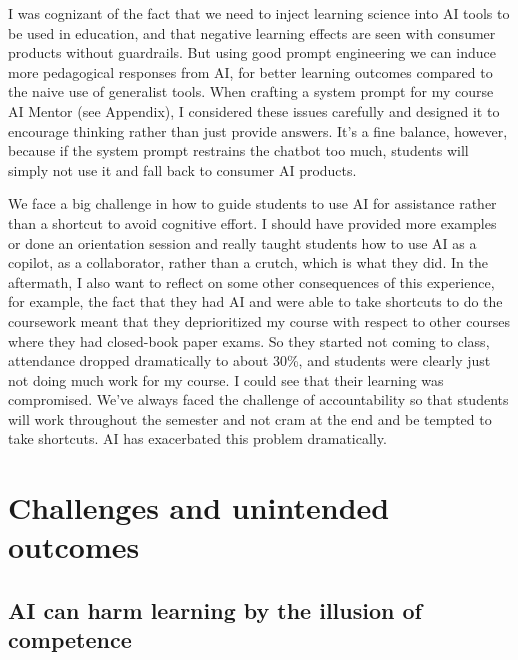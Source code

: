 \documentclass{tufte-handout}
\begin{document}
I was cognizant of the fact that we need to inject learning science into AI tools to be used in education, and that negative learning effects are seen with consumer products without guardrails.\cite{bastani2024generative} But using good prompt engineering we can induce more pedagogical responses from AI, for better learning outcomes compared to the naive use of generalist tools. When crafting a system prompt for my course AI Mentor (see Appendix), I considered these issues carefully and designed it to encourage thinking rather than just provide answers. It’s a fine balance, however, because if the system prompt restrains the chatbot too much, students will simply not use it and fall back to consumer AI products.

We face a big challenge in how to guide students to use AI for assistance rather than a shortcut to avoid cognitive effort. I should have provided more examples or done an orientation session and really taught students how to use AI as a copilot, as a collaborator, rather than a crutch, which is what they did. In the aftermath, I also want to reflect on some other consequences of this experience, for example, the fact that they had AI and were able to take shortcuts to do the coursework meant that they deprioritized my course with respect to other courses where they had closed-book paper exams. So they started not coming to class, attendance dropped dramatically to about 30\%, and students were clearly just not doing much work for my course. I could see that their learning was compromised. We’ve always faced the challenge of accountability so that students will work throughout the semester and not cram at the end and be tempted to take shortcuts. AI has exacerbated this problem dramatically.

\section{Challenges and unintended outcomes}

\subsection{AI can harm learning by the illusion of competence}
\end{document}
